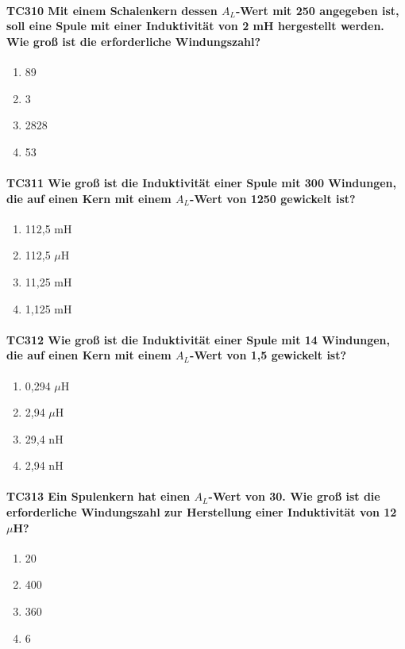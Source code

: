 \documentclass[8pt]{article}
\begin{document}
\begin{enumerate}
\begin{enumerate}[nolistsep,label=\Alph*]
{\paragraph*{TC310 Mit einem Schalenkern dessen $A_{L}$-Wert mit 250 angegeben ist, soll eine Spule mit einer Induktivität von 2 mH hergestellt werden. Wie groß ist die erforderliche Windungszahl?}
\begin{enumerate}[nolistsep,label=\Alph*]
\item 89
\item 3
\item 2828
\item 53
\end{enumerate}

\paragraph*{TC311 Wie groß ist die Induktivität einer Spule mit 300 Windungen, die auf einen Kern mit einem $A_{L}$-Wert von 1250 gewickelt ist?}
\begin{enumerate}[nolistsep,label=\Alph*]
\item 112,5 mH
\item 112,5 $\mu$H
\item 11,25 mH
\item 1,125 mH
\end{enumerate}

\paragraph*{TC312 Wie groß ist die Induktivität einer Spule mit 14 Windungen, die auf einen Kern mit einem $A_{L}$-Wert von 1,5 gewickelt ist?}
\begin{enumerate}[nolistsep,label=\Alph*]
\item 0,294 $\mu$H
\item 2,94 $\mu$H
\item 29,4 nH
\item 2,94 nH
\end{enumerate}

\paragraph*{TC313 Ein Spulenkern hat einen $A_{L}$-Wert von 30. Wie groß ist die erforderliche Windungszahl zur Herstellung einer Induktivität von 12 $\mu$H?}
\begin{enumerate}[nolistsep,label=\Alph*]
\item 20
\item 400
\item 360
\item 6
\end{enumerate}

}
\end{enumerate}
\end{enumerate}
\end{document}
